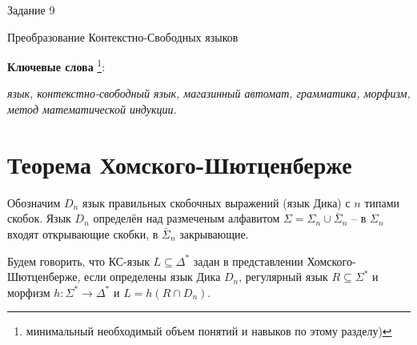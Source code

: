 \documentclass[12pt]{article}
\theoremstyle{definiton}
\theoremstyle{definition}
\theoremstyle{definition}
\begin{document}
\centerline{\LARGE Задание 9}

\medskip

\begin{center}
	{\Large Преобразование Контекстно-Свободных языков}
\end{center}

\bigskip

{\bf Ключевые слова }\footnote{минимальный необходимый объем понятий и навыков по
этому разделу)}:{\em  язык, контекстно-свободный язык, магазинный автомат, грамматика, морфизм, метод математической индукции. %

}

\section{Теорема Хомского-Шютценберже}

Обозначим $D_n$ язык правильных скобочных выражений (язык Дика) с $n$ типами скобок. Язык $D_n$ определён над размеченым алфавитом $\Sigma = \Sigma_n\cup \bar \Sigma_n$ -- в $\Sigma_n$ входят открывающие скобки, в $\bar \Sigma_n$ закрывающие.

Будем говорить, что КС-язык $L \subseteq \Delta^* $ задан в представлении Хомского-Шютценберже, если определены язык Дика $D_n$, регулярный язык $R \subseteq \Sigma^*$ и морфизм $h : \Sigma^* \to \Delta^*$ и $L = h(R\cap D_n)$.
\end{document}
